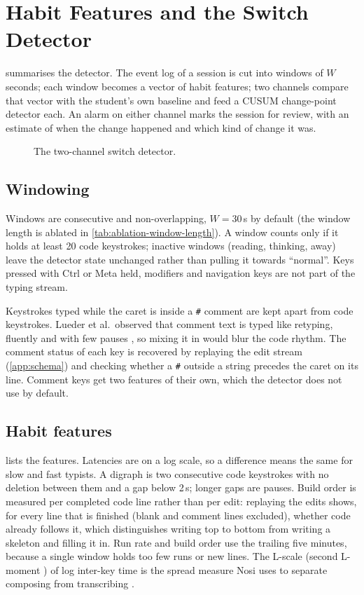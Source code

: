 \chapter{Habit Features and the Switch Detector}
\label{ch:detector}


 summarises the detector. The event log of a session is
cut into windows of $W$ seconds; each window becomes a vector of habit
features; two channels compare that vector with the student's own baseline
and feed a CUSUM change-point detector each. An alarm on either channel
marks the session for review, with an estimate of when the change happened
and which kind of change it was.

\begin{figure}[ht]
  \centering
  \caption{The two-channel switch detector.}
  \label{fig:detector}
\end{figure}

\section{Windowing}
Windows are consecutive and non-overlapping, $W=30$\,s by default (the
window length is ablated in \cref{tab:ablation-window-length}). A window
counts only if it holds at least 20 code keystrokes; inactive windows
(reading, thinking, away) leave the detector state unchanged rather than
pulling it towards ``normal''. Keys pressed with Ctrl or Meta held,
modifiers and navigation keys are not part of the typing stream.

Keystrokes typed while the caret is inside a \texttt{\#} comment are kept
apart from code keystrokes. Lueder et al.\ observed that comment text is
typed like retyping, fluently and with few pauses \cite{lueder2026nosi}, so
mixing it in would blur the code rhythm. The comment status of each key is
recovered by replaying the edit stream (\cref{app:schema}) and checking
whether a \texttt{\#} outside a string precedes the caret on its line.
Comment keys get two features of their own, which the detector does not
use by default.

\section{Habit features}
 lists the features. Latencies are on a log scale, so a
difference means the same for slow and fast typists. A digraph is two
consecutive code keystrokes with no deletion between them and a gap below
2\,s; longer gaps are pauses. Build order is measured per completed code
line rather than per edit: replaying the edits shows, for every line that is
finished (blank and comment lines excluded), whether code already follows it,
which distinguishes writing top to bottom from writing a skeleton and
filling it in. Run rate and build order use the trailing five minutes,
because a single window holds too few runs or new lines. The L-scale (second L-moment
\cite{hosking1990lmoments}) of log inter-key time is the spread measure Nosi
uses to separate composing from transcribing \cite{lueder2026nosi}.

